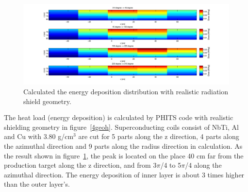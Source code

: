   \begin{figure}[H]
  \centering
  \includegraphics[scale=0.62]{chapter5/fig/HRS.pdf}
  \caption{ Calculated the energy deposition distribution with realistic radiation shield geometry.}
  \label{4heat}
 \end{figure}
The heat load (energy deposition) is calculated by PHITS code with realistic shielding geometry in figure~\ref{4geoh}.
Superconducting coils consist of NbTi, Al and Cu with 3.80 g/cm$^3$ are cut for 5 parts along the z direction, 4 parts along the azimuthal direction and 9 parts along the radius direction in calculation.
As the result shown in figure~\ref{4heat}, the peak is located on the place 40 cm far from the production target along the z direction, and from 3$\pi$/4 to 5$\pi$/4 along the azimuthal direction.
The energy deposition of inner layer is about 3 times higher than the outer layer's.


